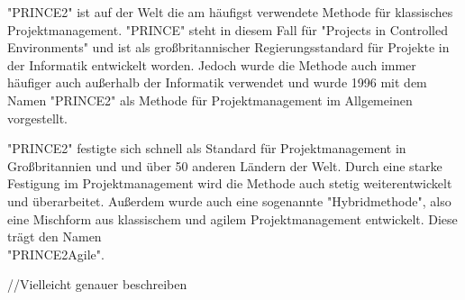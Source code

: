 "PRINCE2" ist auf der Welt die am häufigst verwendete Methode für klassisches Projektmanagement. "PRINCE" steht in diesem Fall für "Projects in Controlled Environments" und ist als großbritannischer Regierungsstandard für Projekte in der Informatik entwickelt worden. Jedoch wurde die Methode auch immer häufiger auch außerhalb der Informatik verwendet und wurde 1996 mit dem Namen "PRINCE2" als Methode für Projektmanagement im Allgemeinen vorgestellt.

"PRINCE2" festigte sich schnell als Standard für Projektmanagement in Großbritannien und und über 50 anderen Ländern der Welt. Durch eine starke Festigung im Projektmanagement wird die Methode auch stetig weiterentwickelt und überarbeitet. Außerdem wurde auch eine sogenannte "Hybridmethode", also eine Mischform aus klassischem und agilem Projektmanagement entwickelt. Diese trägt den Namen\\ "PRINCE2Agile". \cite{Projectman.}

//Vielleicht genauer beschreiben
